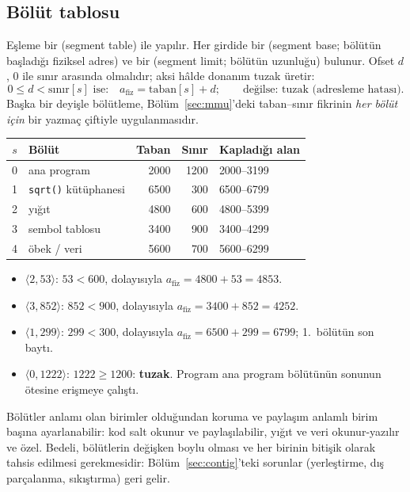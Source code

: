 \subsection{Bölüt tablosu}
\label{sec:segtable}

Eşleme bir  (segment table) ile yapılır. Her girdide bir  (segment base; bölütün başladığı fiziksel adres) ve bir  (segment limit; bölütün uzunluğu) bulunur. Ofset $d$, $0$ ile sınır arasında olmalıdır; aksi hâlde donanım tuzak üretir:
\[
0 \le d < \text{sınır}[s] \text{ ise:}\quad a_{\text{fiz}} = \text{taban}[s] + d;\qquad\text{değilse: tuzak (adresleme hatası).}
\]
Başka bir deyişle bölütleme, Bölüm~\ref{sec:mmu}'deki taban--sınır fikrinin \emph{her bölüt için} bir yazmaç çiftiyle uygulanmasıdır.

\begin{example}
\begin{center}
\renewcommand{\arraystretch}{1.2}
\begin{tabular}{@{}clrrl@{}}
\toprule
$s$ & \textbf{Bölüt} & \textbf{Taban} & \textbf{Sınır} & \textbf{Kapladığı alan} \\
\midrule
0 & ana program & 2000 & 1200 & 2000--3199 \\
1 & \texttt{sqrt()} kütüphanesi & 6500 & 300 & 6500--6799 \\
2 & yığıt & 4800 & 600 & 4800--5399 \\
3 & sembol tablosu & 3400 & 900 & 3400--4299 \\
4 & öbek / veri & 5600 & 700 & 5600--6299 \\
\bottomrule
\end{tabular}
\end{center}
\begin{itemize}
  \item $\langle 2, 53\rangle$: $53 < 600$, dolayısıyla $a_{\text{fiz}} = 4800 + 53 = 4853$.
  \item $\langle 3, 852\rangle$: $852 < 900$, dolayısıyla $a_{\text{fiz}} = 3400 + 852 = 4252$.
  \item $\langle 1, 299\rangle$: $299 < 300$, dolayısıyla $a_{\text{fiz}} = 6500 + 299 = 6799$; 1.~bölütün son baytı.
  \item $\langle 0, 1222\rangle$: $1222 \ge 1200$: \textbf{tuzak}. Program ana program bölütünün sonunun ötesine erişmeye çalıştı.
\end{itemize}
\end{example}

Bölütler anlamı olan birimler olduğundan koruma ve paylaşım anlamlı birim başına ayarlanabilir: kod salt okunur ve paylaşılabilir, yığıt ve veri okunur-yazılır ve özel. Bedeli, bölütlerin değişken boylu olması ve her birinin bitişik olarak tahsis edilmesi gerekmesidir: Bölüm~\ref{sec:contig}'teki sorunlar (yerleştirme, dış parçalanma, sıkıştırma) geri gelir.

